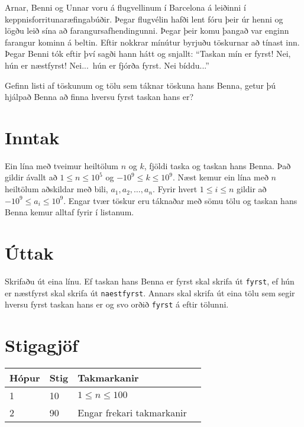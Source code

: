 Arnar, Benni og Unnar voru á flugvellinum í Barcelona á leiðinni í keppnisforritunaræfingabúðir.
Þegar flugvélin hafði lent fóru þeir úr henni og lögðu leið sína að farangursafhendingunni.
Þegar þeir komu þangað var enginn farangur kominn á beltin.
Eftir nokkrar mínútur byrjuðu töskurnar að tínast inn.
Þegar Benni tók eftir því sagði hann hátt og snjallt: ``Taskan mín er fyrst! Nei, hún er næstfyrst! Nei...\ hún er fjórða fyrst. Nei bíddu...''

Gefinn listi af töskunum og tölu sem táknar töskuna hans Benna, getur þú hjálpað Benna að finna hversu fyrst taskan hans er?

\section*{Inntak}
Ein lína með tveimur heiltölum $n$ og $k$, fjöldi taska og taskan hans Benna. Það gildir ávallt að $1 \leq n \leq 10^5$ og $-10^9 \leq k \leq 10^9$.
Næst kemur ein lína með $n$ heiltölum aðskildar með bili, $a_1, a_2, \dotsc, a_n$. Fyrir hvert $1 \leq i \leq n$ gildir að $-10^9 \leq a_i \leq 10^9$.
Engar tvær töskur eru táknaðar með sömu tölu og taskan hans Benna kemur alltaf fyrir í listanum. 

\section*{Úttak}
Skrifaðu út eina línu. Ef taskan hans Benna er fyrst skal skrifa út \texttt{fyrst}, ef hún er næstfyrst skal skrifa út \texttt{naestfyrst}.
Annars skal skrifa út eina tölu sem segir hversu fyrst taskan hans er og svo orðið \texttt{fyrst} á eftir tölunni.

\section*{Stigagjöf}
\begin{tabular}{|l|l|l|l|}
\hline
Hópur & Stig & Takmarkanir \\ \hline
1     & 10  & $1 \leq n \leq 100$ \\ \hline
2     & 90  & Engar frekari takmarkanir \\ \hline
\end{tabular}

